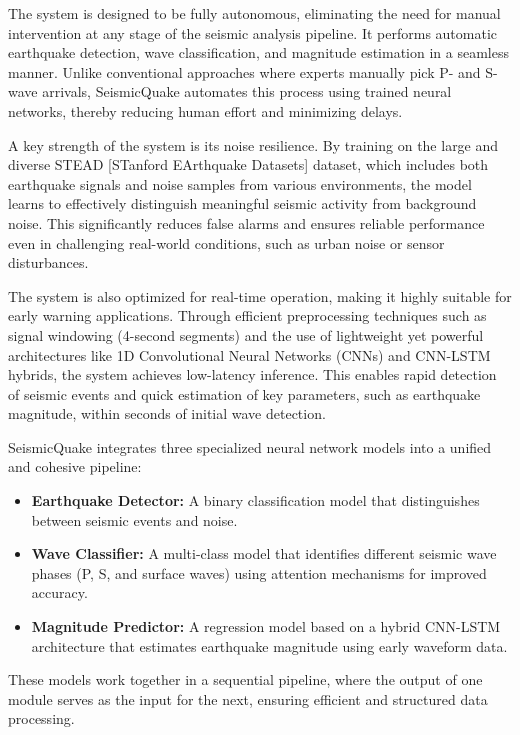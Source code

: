\documentclass[a4paper,12pt]{report}
\begin{document}
The system is designed to be fully autonomous, eliminating the need for manual intervention at any stage of the seismic analysis pipeline. It performs automatic earthquake detection, wave classification, and magnitude estimation in a seamless manner. Unlike conventional approaches where experts manually pick P- and S-wave arrivals, SeismicQuake automates this process using trained neural networks, thereby reducing human effort and minimizing delays.

A key strength of the system is its noise resilience. By training on the large and diverse STEAD [STanford EArthquake Datasets] dataset, which includes both earthquake signals and noise samples from various environments, the model learns to effectively distinguish meaningful seismic activity from background noise. This significantly reduces false alarms and ensures reliable performance even in challenging real-world conditions, such as urban noise or sensor disturbances.

The system is also optimized for real-time operation, making it highly suitable for early warning applications. Through efficient preprocessing techniques such as signal windowing (4-second segments) and the use of lightweight yet powerful architectures like 1D Convolutional Neural Networks (CNNs) and CNN-LSTM hybrids, the system achieves low-latency inference. This enables rapid detection of seismic events and quick estimation of key parameters, such as earthquake magnitude, within seconds of initial wave detection.

SeismicQuake integrates three specialized neural network models into a unified and cohesive pipeline:
\begin{itemize}
\item \textbf{Earthquake Detector:} A binary classification model that distinguishes between seismic events and noise.
\item \textbf{Wave Classifier:} A multi-class model that identifies different seismic wave phases (P, S, and surface waves) using attention mechanisms for improved accuracy.
\item \textbf{Magnitude Predictor:} A regression model based on a hybrid CNN-LSTM architecture that estimates earthquake magnitude using early waveform data.
\end{itemize}

These models work together in a sequential pipeline, where the output of one module serves as the input for the next, ensuring efficient and structured data processing.
\end{document}
